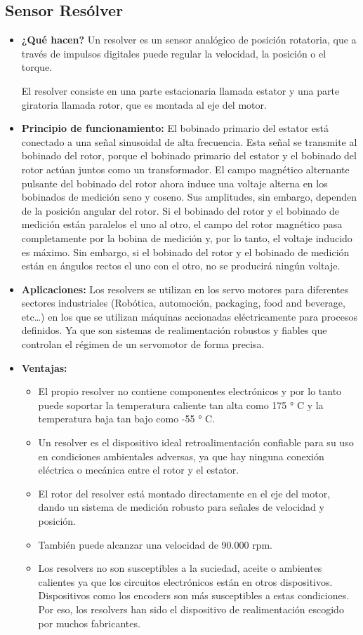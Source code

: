 \subsection*{Sensor Resólver}
\begin{itemize}
	\item \textbf{¿Qué hacen?} Un resolver es un sensor analógico de posición rotatoria, que a través de impulsos digitales puede regular la velocidad, la posición o el torque.
	
	El resolver consiste en una parte estacionaria llamada estator y una parte giratoria llamada rotor, que es montada al eje del motor. \cite{Servomotors_ResolverFeedback}
	
	\item \textbf{Principio de funcionamiento:} El bobinado primario del estator está conectado a una señal sinusoidal de alta frecuencia. Esta señal se transmite al bobinado del rotor, porque el bobinado primario del estator y el bobinado del rotor actúan juntos como un transformador. El campo magnético alternante pulsante del bobinado del rotor ahora induce una voltaje alterna en los bobinados de medición seno y coseno. Sus amplitudes, sin embargo, dependen de la posición angular del rotor.
	Si el bobinado del rotor y el bobinado de medición están paralelos el uno al otro, el campo del rotor magnético pasa completamente por la bobina de medición y, por lo tanto, el voltaje inducido es máximo.
	Sin embargo, si el bobinado del rotor y el bobinado de medición están en ángulos rectos el uno con el otro, no se producirá ningún voltaje.
	
	\item \textbf{Aplicaciones:} Los resolvers se utilizan en los servo motores para diferentes sectores industriales (Robótica, automoción, packaging, food and beverage, etc…) en los que se utilizan máquinas accionadas eléctricamente para procesos definidos. Ya que son sistemas de realimentación robustos y fiables que controlan el régimen de un servomotor de forma precisa.
	\item \textbf{Ventajas:}
	\begin{itemize}
		\item El propio resolver no contiene componentes electrónicos y por lo tanto puede soportar la temperatura caliente tan alta como 175 ° C y la temperatura baja tan bajo como -55 ° C.
		\item Un resolver es el dispositivo ideal retroalimentación confiable para su uso en condiciones ambientales adversas, ya que hay ninguna conexión eléctrica o mecánica entre el rotor y el estator.
		\item El rotor del resolver está montado directamente en el eje del motor, dando un sistema de medición robusto para señales de velocidad y posición.
		\item También puede alcanzar una velocidad de 90.000 rpm.
		\item Los resolvers no son susceptibles a la suciedad, aceite o ambientes calientes ya que los circuitos electrónicos están en otros dispositivos. Dispositivos como los encoders son más susceptibles a estas condiciones. Por eso, los resolvers han sido el dispositivo de realimentación escogido por muchos fabricantes.
	\end{itemize}
\end{itemize}
